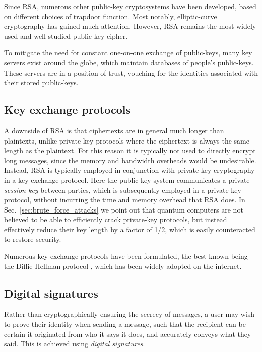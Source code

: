 Since RSA, numerous other public-key cryptosystems have been developed, based on different choices of trapdoor function. Most notably, elliptic-curve cryptography has gained much attention. However, RSA remains the most widely used and well studied public-key cipher.

To mitigate the need for constant one-on-one exchange of public-keys, many key servers exist around the globe, which maintain databases of people's public-keys. These servers are in a position of trust, vouching for the identities associated with their stored public-keys.

%
%

\subsection{Key exchange protocols}

A downside of RSA is that ciphertexts are in general much longer than plaintexts, unlike private-key protocols where the ciphertext is always the same length as the plaintext. For this reason it is typically not used to directly encrypt long messages, since the memory and bandwidth overheads would be undesirable. Instead, RSA is typically employed in conjunction with private-key cryptography in a key exchange protocol. Here the public-key system communicates a private \textit{session key} between parties, which is subsequently employed in a private-key protocol, without incurring the time and memory overhead that RSA does. In Sec.~\ref{sec:brute_force_attacks} we point out that quantum computers are not believed to be able to efficiently crack private-key protocols, but instead effectively reduce their key length by a factor of 1/2, which is easily counteracted to restore security.

Numerous key exchange protocols have been formulated, the best known being the Diffie-Hellman protocol \cite{DiffieHellman}, which has been widely adopted on the internet.

%
%

\subsection{Digital signatures} \label{sec:dig_sig} 

Rather than cryptographically ensuring the secrecy of messages, a user may wish to prove their identity when sending a message, such that the recipient can be certain it originated from who it says it does, and accurately conveys what they said. This is achieved using \textit{digital signatures}.

